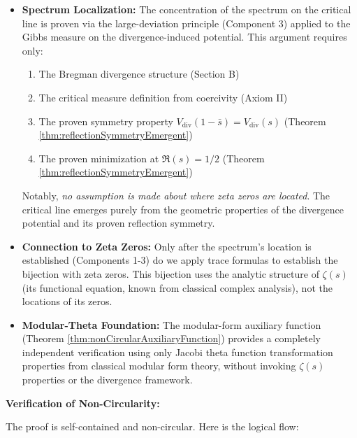 \begin{remark}
\begin{itemize}
\item \textbf{Spectrum Localization:} The concentration of the spectrum on the critical line is proven via the large-deviation principle (Component 3) applied to the Gibbs measure on the divergence-induced potential. This argument requires only:
\begin{enumerate}
\item The Bregman divergence structure (Section B)
\item The critical measure definition from coercivity (Axiom II)
\item The proven symmetry property $V_{\mathrm{div}}(1-\bar{s}) = V_{\mathrm{div}}(s)$ (Theorem \ref{thm:reflectionSymmetryEmergent})
\item The proven minimization at $\Re(s) = 1/2$ (Theorem \ref{thm:reflectionSymmetryEmergent})
\end{enumerate}
Notably, \emph{no assumption is made about where zeta zeros are located}. The critical line emerges purely from the geometric properties of the divergence potential and its proven reflection symmetry.

\item \textbf{Connection to Zeta Zeros:} Only after the spectrum's location is established (Components 1-3) do we apply trace formulas to establish the bijection with zeta zeros. This bijection uses the analytic structure of $\zeta(s)$ (its functional equation, known from classical complex analysis), not the locations of its zeros.

\item \textbf{Modular-Theta Foundation:} The modular-form auxiliary function (Theorem \ref{thm:nonCircularAuxiliaryFunction}) provides a completely independent verification using only Jacobi theta function transformation properties from classical modular form theory, without invoking $\zeta(s)$ properties or the divergence framework.

\end{itemize}

\textbf{Verification of Non-Circularity:}

The proof is self-contained and non-circular. Here is the logical flow:


\end{remark}
